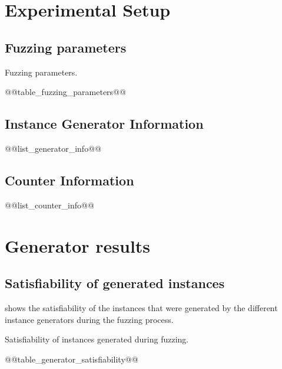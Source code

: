 \documentclass[british]{article}
\begin{document}
\newpage 

\section{Experimental Setup}
\label{sec:experimental-setup}

\subsection{Fuzzing parameters}
\label{subsec:fuzzing-parameters}

\begin{table}[ht]
    \begin{center}
    {\footnotesize
    \caption{Fuzzing parameters.}
    \label{tab:fuzzing-parameters}
@@table_fuzzing_parameters@@
    }
    \end{center}
\end{table}

\FloatBarrier

\subsection{Instance Generator Information}
\label{subsec:instance-generator-information}

@@list_generator_info@@

\subsection{Counter Information}
\label{subsec:counter-information}

@@list_counter_info@@

\section{Generator results}
\label{sec:generator-results}


\subsection{Satisfiability of generated instances}
 shows the satisfiability of the instances that were generated by the different instance generators during the fuzzing process.

\begin{table}[ht]
    \begin{center}
    \caption{Satisfiability of instances generated during fuzzing.}
    \label{tab:generator-satisfiability}
@@table_generator_satisfiability@@
    \end{center}
\end{table}
\end{document}
